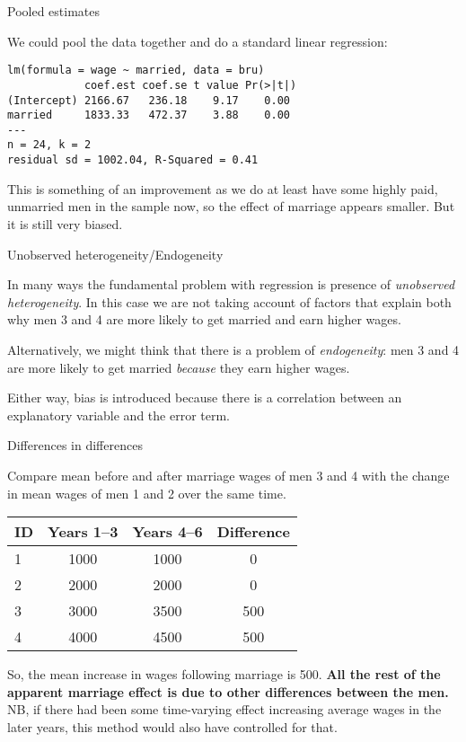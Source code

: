 \documentclass[10pt,ignorenonframetext,]{beamer}
\begin{document}
\begin{frame}[fragile]{Pooled estimates}

We could pool the data together and do a standard linear regression:

\begin{verbatim}
lm(formula = wage ~ married, data = bru)
            coef.est coef.se t value Pr(>|t|)
(Intercept) 2166.67   236.18    9.17    0.00 
married     1833.33   472.37    3.88    0.00 
---
n = 24, k = 2
residual sd = 1002.04, R-Squared = 0.41
\end{verbatim}

This is something of an improvement as we do at least have some highly
paid, unmarried men in the sample now, so the effect of marriage appears
smaller. But it is still very biased.

\end{frame}

\begin{frame}{Unobserved heterogeneity/Endogeneity}

In many ways the fundamental problem with regression is presence of
\emph{unobserved heterogeneity}. In this case we are not taking account
of factors that explain both why men 3 and 4 are more likely to get
married and earn higher wages.

Alternatively, we might think that there is a problem of
\emph{endogeneity}: men 3 and 4 are more likely to get married
\emph{because} they earn higher wages.

Either way, bias is introduced because there is a correlation between an
explanatory variable and the error term.

\end{frame}

\begin{frame}{Differences in differences}

Compare mean before and after marriage wages of men 3 and 4 with the
change in mean wages of men 1 and 2 over the same time.

\begin{tabular}{lccc}
\hline
ID & Years 1--3 & Years 4--6& Difference\\
\hline
1 & 1000 & 1000 & 0\\
2 & 2000 & 2000 &  0\\
3 & 3000 & 3500 & 500\\
4 & 4000 & 4500 & 500\\
\hline
\end{tabular}

So, the mean increase in wages following marriage is 500. \textbf{All
the rest of the apparent marriage effect is due to other differences
between the men.} NB, if there had been some time-varying effect
increasing average wages in the later years, this method would also have
controlled for that.

\end{frame}
\end{document}

